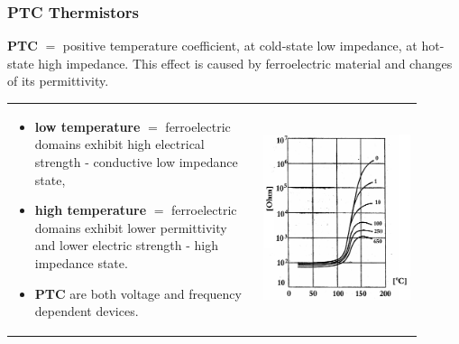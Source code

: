 \documentclass{beamer}
\begin{document}
	\begin{frame}
    \frametitle{PTC Thermistors}
		\textbf{PTC} $=$ positive temperature coefficient, at cold-state low impedance, at hot-state high impedance. This effect is caused by ferroelectric material and changes of its permittivity.
		\small
		\begin{tabular}{m{0.55\linewidth} m{0.35\linewidth}}
			\begin{itemize}
				\item \textbf{low temperature} $=$ ferroelectric domains exhibit high electrical strength - conductive low impedance state,
				\item \textbf{high temperature} $=$ ferroelectric domains exhibit lower permittivity and lower electric strength - high impedance state.
				\item \textbf{PTC} are both voltage and frequency dependent devices.
			\end{itemize} & \includegraphics[scale=0.4]{obr11_zavislostNaTepPTC.png}
		\end{tabular}
  \end{frame}
\end{document}
